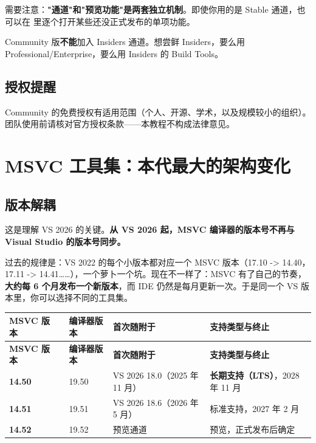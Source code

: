 需要注意：\textbf{"通道"和"预览功能"是两套独立机制}。即使你用的是 Stable 通道，也可以在  里逐个打开某些还没正式发布的单项功能。

\begin{warnbox}[注意]
Community 版\textbf{不能}加入 Insiders 通道。想尝鲜 Insiders，要么用 Professional/Enterprise，要么用 Insiders 的 Build Tools。
\end{warnbox}

\subsection{授权提醒}
Community 的免费授权有适用范围（个人、开源、学术，以及规模较小的组织）。团队使用前请核对官方授权条款——本教程不构成法律意见。

\section{MSVC 工具集：本代最大的架构变化}
\subsection{版本解耦}
这是理解 VS 2026 的关键。\textbf{从 VS 2026 起，MSVC 编译器的版本号不再与 Visual Studio 的版本号同步。}

过去的规律是：VS 2022 的每个小版本都对应一个 MSVC 版本（17.10 -> 14.40，17.11 -> 14.41……），一个萝卜一个坑。现在不一样了：MSVC 有了自己的节奏，\textbf{大约每 6 个月发布一个新版本}，而 IDE 仍然是每月更新一次。于是同一个 VS 版本里，你可以选择不同的工具集。

\begin{longtable}{L{2.2cm}C{1.8cm}C{2.0cm}L{3.8cm}L{4.0cm}}
\toprule
\textbf{MSVC 版本} & \textbf{} & \textbf{编译器版本} & \textbf{首次随附于} & \textbf{支持类型与终止} \\
\midrule
\endfirsthead
\toprule
\textbf{MSVC 版本} & \textbf{} & \textbf{编译器版本} & \textbf{首次随附于} & \textbf{支持类型与终止} \\
\midrule
\endhead
\bottomrule
\endlastfoot
\textbf{14.50} &  & 19.50 & VS 2026 18.0（2025 年 11 月） & \textbf{长期支持（LTS）}，2028 年 11 月 \\
\textbf{14.51} &  & 19.51 & VS 2026 18.6（2026 年 5 月） & 标准支持，2027 年 2 月 \\
\textbf{14.52} &  & 19.52 & 预览通道 & 预览，正式发布后确定 \\
\end{longtable}

